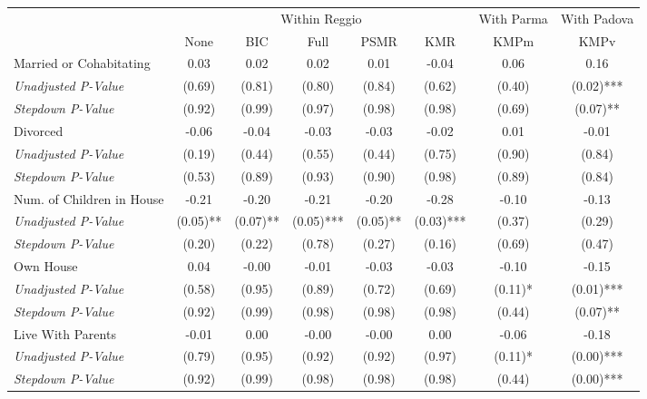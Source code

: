 \begin{tabular}{l c c c c c c c}
\toprule
& \multicolumn{5}{c}{Within Reggio} & With Parma & With Padova \\\cmidrule(lr){2-6} \cmidrule(lr){7-7} \cmidrule(lr){8-8}
 & None & BIC & Full & PSMR & KMR & KMPm & KMPv \\
\midrule
Married or Cohabitating & 0.03 & 0.02 & 0.02 & 0.01 & -0.04 & 0.06 & 0.16 \\
\quad \textit{Unadjusted P-Value} & (0.69) & (0.81) & (0.80) & (0.84) & (0.62) & (0.40) & (0.02)*** \\
\quad \textit{Stepdown P-Value} & (0.92) & (0.99) & (0.97) & (0.98) & (0.98) & (0.69) & (0.07)** \\
Divorced & -0.06 & -0.04 & -0.03 & -0.03 & -0.02 & 0.01 & -0.01 \\
\quad \textit{Unadjusted P-Value} & (0.19) & (0.44) & (0.55) & (0.44) & (0.75) & (0.90) & (0.84) \\
\quad \textit{Stepdown P-Value} & (0.53) & (0.89) & (0.93) & (0.90) & (0.98) & (0.89) & (0.84) \\
Num. of Children in House & -0.21 & -0.20 & -0.21 & -0.20 & -0.28 & -0.10 & -0.13 \\
\quad \textit{Unadjusted P-Value} & (0.05)** & (0.07)** & (0.05)*** & (0.05)** & (0.03)*** & (0.37) & (0.29) \\
\quad \textit{Stepdown P-Value} & (0.20) & (0.22) & (0.78) & (0.27) & (0.16) & (0.69) & (0.47) \\
Own House & 0.04 & -0.00 & -0.01 & -0.03 & -0.03 & -0.10 & -0.15 \\
\quad \textit{Unadjusted P-Value} & (0.58) & (0.95) & (0.89) & (0.72) & (0.69) & (0.11)* & (0.01)*** \\
\quad \textit{Stepdown P-Value} & (0.92) & (0.99) & (0.98) & (0.98) & (0.98) & (0.44) & (0.07)** \\
Live With Parents & -0.01 & 0.00 & -0.00 & -0.00 & 0.00 & -0.06 & -0.18 \\
\quad \textit{Unadjusted P-Value} & (0.79) & (0.95) & (0.92) & (0.92) & (0.97) & (0.11)* & (0.00)*** \\
\quad \textit{Stepdown P-Value} & (0.92) & (0.99) & (0.98) & (0.98) & (0.98) & (0.44) & (0.00)*** \\
\bottomrule
\end{tabular}
